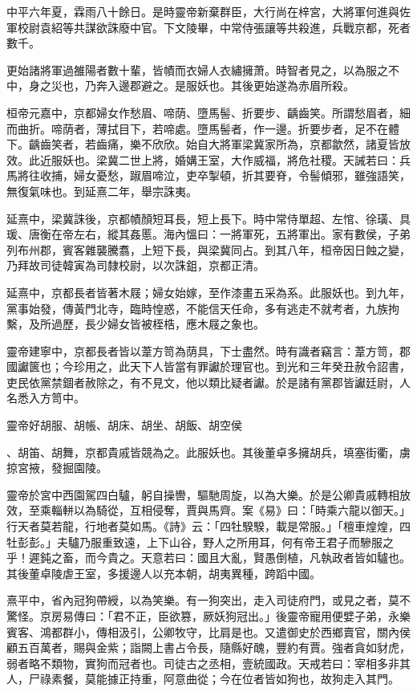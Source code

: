 \begin{pinyinscope}
中平六年夏，霖雨八十餘日。是時靈帝新棄群臣，大行尚在梓宮，大將軍何進與佐軍校尉袁紹等共謀欲誅廢中官。下文陵畢，中常侍張讓等共殺進，兵戰京都，死者數千。

更始諸將軍過雒陽者數十輩，皆幘而衣婦人衣繡擁萧。時智者見之，以為服之不中，身之災也，乃奔入邊郡避之。是服妖也。其後更始遂為赤眉所殺。

桓帝元嘉中，京都婦女作愁眉、啼荫、墮馬髻、折要步、齲齒笑。所謂愁眉者，細而曲折。啼荫者，薄拭目下，若啼處。墮馬髻者，作一邊。折要步者，足不在體下。齲齒笑者，若齒痛，樂不欣欣。始自大將軍梁冀家所為，京都歙然，諸夏皆放效。此近服妖也。梁冀二世上將，婚媾王室，大作威福，將危社稷。天誡若曰：兵馬將往收捕，婦女憂愁，踧眉啼泣，吏卒掣頓，折其要脊，令髻傾邪，雖強語笑，無復氣味也。到延熹二年，舉宗誅夷。

延熹中，梁冀誅後，京都幘顏短耳長，短上長下。時中常侍單超、左悺、徐璜、具瑗、唐衡在帝左右，縱其姦慝。海內慍曰：一將軍死，五將軍出。家有數侯，子弟列布州郡，賓客雜襲騰翥，上短下長，與梁冀同占。到其八年，桓帝因日蝕之變，乃拜故司徒韓寅為司隸校尉，以次誅鉏，京都正清。

延熹中，京都長者皆著木屐；婦女始嫁，至作漆畫五采為系。此服妖也。到九年，黨事始發，傳黃門北寺，臨時惶惑，不能信天任命，多有逃走不就考者，九族拘繫，及所過歷，長少婦女皆被桎梏，應木屐之象也。

靈帝建寧中，京都長者皆以葦方笥為荫具，下士盡然。時有識者竊言：葦方笥，郡國讞篋也；今珍用之，此天下人皆當有罪讞於理官也。到光和三年癸丑赦令詔書，吏民依黨禁錮者赦除之，有不見文，他以類比疑者讞。於是諸有黨郡皆讞廷尉，人名悉入方笥中。

靈帝好胡服、胡帳、胡床、胡坐、胡飯、胡空侯

、胡笛、胡舞，京都貴戚皆競為之。此服妖也。其後董卓多擁胡兵，填塞街衢，虜掠宮掖，發掘園陵。

靈帝於宮中西園駕四白驢，躬自操轡，驅馳周旋，以為大樂。於是公卿貴戚轉相放效，至乘輜軿以為騎從，互相侵奪，賈與馬齊。案《易》曰：「時乘六龍以御天。」行天者莫若龍，行地者莫如馬。《詩》云：「四牡騤騤，載是常服。」「檀車煌煌，四牡彭彭。」夫驢乃服重致遠，上下山谷，野人之所用耳，何有帝王君子而驂服之乎！遲鈍之畜，而今貴之。天意若曰：國且大亂，賢愚倒植，凡執政者皆如驢也。其後董卓陵虐王室，多援邊人以充本朝，胡夷異種，跨蹈中國。

熹平中，省內冠狗帶綬，以為笑樂。有一狗突出，走入司徒府門，或見之者，莫不驚怪。京房易傳曰：「君不正，臣欲篡，厥妖狗冠出。」後靈帝寵用便嬖子弟，永樂賓客、鴻都群小，傳相汲引，公卿牧守，比肩是也。又遣御史於西鄉賣官，關內侯顧五百萬者，賜與金紫；詣闕上書占令長，隨縣好醜，豐約有賈。強者貪如豺虎，弱者略不類物，實狗而冠者也。司徒古之丞相，壹統國政。天戒若曰：宰相多非其人，尸祿素餐，莫能據正持重，阿意曲從；今在位者皆如狗也，故狗走入其門。


\end{pinyinscope}
